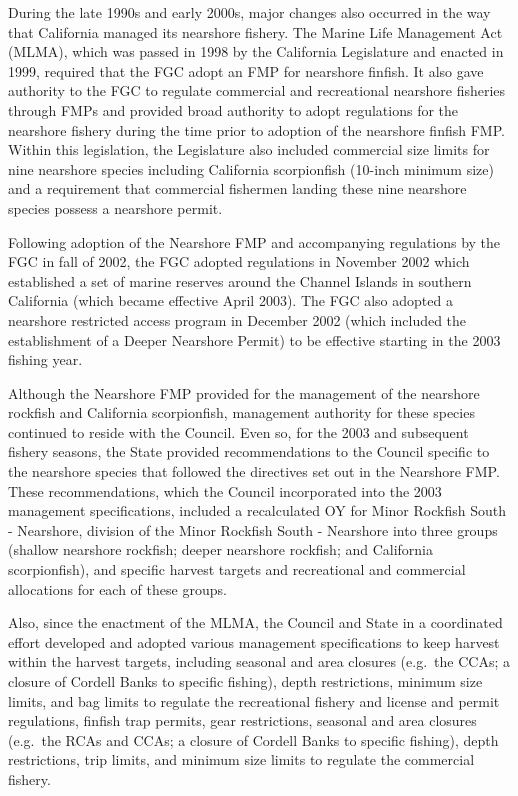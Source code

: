 \documentclass[12pt,]{article}
\begin{document}
During the late 1990s and early 2000s, major changes also occurred in
the way that California managed its nearshore fishery. The Marine Life
Management Act (MLMA), which was passed in 1998 by the California
Legislature and enacted in 1999, required that the FGC adopt an FMP for
nearshore finfish. It also gave authority to the FGC to regulate
commercial and recreational nearshore fisheries through FMPs and
provided broad authority to adopt regulations for the nearshore fishery
during the time prior to adoption of the nearshore finfish FMP. Within
this legislation, the Legislature also included commercial size limits
for nine nearshore species including California scorpionfish (10-inch
minimum size) and a requirement that commercial fishermen landing these
nine nearshore species possess a nearshore permit.

Following adoption of the Nearshore FMP and accompanying regulations by
the FGC in fall of 2002, the FGC adopted regulations in November 2002
which established a set of marine reserves around the Channel Islands in
southern California (which became effective April 2003). The FGC also
adopted a nearshore restricted access program in December 2002 (which
included the establishment of a Deeper Nearshore Permit) to be effective
starting in the 2003 fishing year.

Although the Nearshore FMP provided for the management of the nearshore
rockfish and California scorpionfish, management authority for these
species continued to reside with the Council. Even so, for the 2003 and
subsequent fishery seasons, the State provided recommendations to the
Council specific to the nearshore species that followed the directives
set out in the Nearshore FMP. These recommendations, which the Council
incorporated into the 2003 management specifications, included a
recalculated OY for Minor Rockfish South - Nearshore, division of the
Minor Rockfish South - Nearshore into three groups (shallow nearshore
rockfish; deeper nearshore rockfish; and California scorpionfish), and
specific harvest targets and recreational and commercial allocations for
each of these groups.

Also, since the enactment of the MLMA, the Council and State in a
coordinated effort developed and adopted various management
specifications to keep harvest within the harvest targets, including
seasonal and area closures (e.g.~the CCAs; a closure of Cordell Banks to
specific fishing), depth restrictions, minimum size limits, and bag
limits to regulate the recreational fishery and license and permit
regulations, finfish trap permits, gear restrictions, seasonal and area
closures (e.g.~the RCAs and CCAs; a closure of Cordell Banks to specific
fishing), depth restrictions, trip limits, and minimum size limits to
regulate the commercial fishery.
\end{document}
